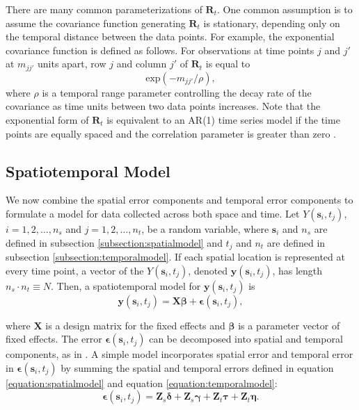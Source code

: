 \documentclass[]{interact}
\theoremstyle{plain}%
\theoremstyle{definition}
\theoremstyle{remark}
\begin{document}
There are many common parameterizations of \(\mathbf{R}_{t}\). One
common assumption is to assume the covariance function generating
\(\mathbf{R}_t\) is stationary, depending only on the temporal distance
between the data points. For example, the exponential covariance
function is defined as follows. For observations at time points \(j\)
and \(j'\) at \(m_{jj'}\) units apart, row \(j\) and column \(j'\) of
\(\mathbf{R}_{t}\) is equal to \mbox{} \begin{equation}
\label{equation:tempcov}
\text{exp}(-m_{jj'} / \rho),
\end{equation} \noindent where \(\rho\) is a temporal range parameter
controlling the decay rate of the covariance as time units between two
data points increases. Note that the exponential form of
\(\mathbf{R}_t\) is equivalent to an AR(1) time series model if the time
points are equally spaced and the correlation parameter is greater than
zero \citep{schabenberger2017statistical}.

\subsection{Spatiotemporal Model}

We now combine the spatial error components and temporal error
components to formulate a model for data collected across both space and
time. Let \(Y(\mathbf{s}_{i}, t_j)\), \(i = 1, 2, \ldots, n_{s}\) and
\(j = 1, 2, \ldots, n_{t}\), be a random variable, where
\(\mathbf{s}_i\) and \(n_s\) are defined in subsection
\ref{subsection:spatialmodel} and \(t_j\) and \(n_t\) are defined in
subsection \ref{subsection:temporalmodel}. If each spatial location is
represented at every time point, a vector of the
\(Y(\mathbf{s}_{i}, t_j)\), denoted \(\mathbf{y}(\mathbf{s}_{i}, t_j)\),
has length \(n_{s} \cdot n_{t} \equiv N\). Then, a spatiotemporal model
for \(\mathbf{y}(\mathbf{s}_{i}, t_j)\) is \mbox{} \begin{equation}
\mathbf{y}(\mathbf{s}_{i}, t_j) = \mathbf{X} \bm{\beta} + \bm{\epsilon}(\mathbf{s}_{i}, t_j),
\end{equation}

\noindent where \(\mathbf{X}\) is a design matrix for the fixed effects
and \(\bm{\beta}\) is a parameter vector of fixed effects. The error
\(\bm{\epsilon}(\mathbf{s}_{i}, t_j)\) can be decomposed into spatial
and temporal components, as in \citet{dumelle2021linear}. A simple model
incorporates spatial error and temporal error in
\(\bm{\epsilon}(\mathbf{s}_{i}, t_j)\) by summing the spatial and
temporal errors defined in equation \ref{equation:spatialmodel} and
equation \ref{equation:temporalmodel}: \mbox{} \begin{equation}
\label{equation:sumcovmodel}
\bm{\epsilon}(\mathbf{s}_{i}, t_j) = \mathbf{Z}_{s} \bm{\delta} + \mathbf{Z}_{s} \bm{\gamma} + \mathbf{Z}_{t} \bm{\tau} + \mathbf{Z}_{t} \bm{\eta}.
\end{equation}
\end{document}

